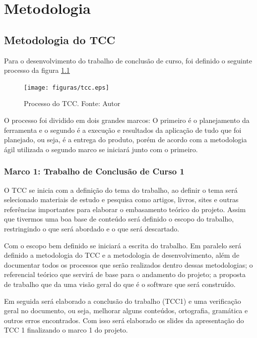 \chapter{Metodologia}

\section{Metodologia do TCC}

Para o desenvolvimento do trabalho de conclusão de curso, foi definido o seguinte processo da figura \ref{fig:tcc}

\begin{figure}[h!]
	\centering
  \texttt{[image: figuras/tcc.eps]}
  \caption[Processo do TCC.]{Processo do TCC. Fonte: Autor}
	\label{fig:tcc}
\end{figure}


O processo foi dividido em dois grandes marcos: O primeiro é o planejamento da ferramenta e o segundo é a execução e resultados da aplicação de tudo que foi planejado, ou seja, é a entrega do produto, porém de acordo com a metodologia ágil utilizada o segundo marco se iniciará junto com o primeiro.

\subsection{Marco 1: Trabalho de Conclusão de Curso 1}

O TCC se inicia com a definição do tema do trabalho, ao definir o tema será selecionado materiais de estudo e pesquisa como artigos, livros, sites e outras referências importantes para elaborar o embasamento teórico do projeto. Assim que tivermos uma boa base de conteúdo será definido o escopo do trabalho, restringindo o que será abordado e o que será descartado.

Com o escopo bem definido se iniciará a escrita do trabalho. Em paralelo será definido a metodologia do TCC e a metodologia de desenvolvimento, além de documentar todos os processos que serão realizados dentro dessas metodologias; o referencial teórico que servirá de base para o andamento do projeto; a proposta de trabalho que da uma visão geral do que é o software que será construído.

Em seguida será elaborado a conclusão do trabalho (TCC1) e uma verificação geral no documento, ou seja, melhorar alguns conteúdos, ortografia, gramática e outros erros encontrados. Com isso será elaborado os slides da apresentação do TCC 1 finalizando o marco 1 do projeto.

